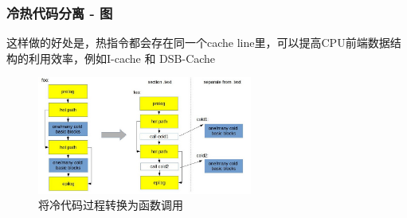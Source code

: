 \begin{frame}
    \frametitle{冷热代码分离 - 图}
    这样做的好处是，热指令都会存在同一个cache line里，可以提高CPU前端数据结构的利用效率，例如I-cache 和 DSB-Cache
    \begin{figure}
        \centering
        \includegraphics[width=0.63\textwidth]{images/splitting.png}
        \caption{将冷代码过程转换为函数调用}
    \end{figure}

\end{frame}